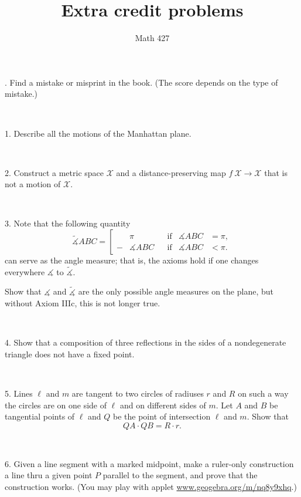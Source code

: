 \documentclass[oneside,a4paper]{article}
\def\noi{\noindent}
\begin{document}
\title{Extra credit problems}
\author{Math 427}
\date{}
\maketitle


\noi 0. Find a mistake or misprint in the book.
(The score depends on the type of mistake.)

\ 

\noi %
{1.} Describe all the motions of the Manhattan plane.

\ 

\noi %
{2.} %
Construct a metric space $\mathcal X$ and a distance-preserving map $f\:\mathcal X\to \mathcal X$ that is not a motion of $\mathcal X$.

\ 

\noi %
{3.} Note that the following quantity 
$$\tilde
\measuredangle ABC=\left[
\begin{aligned}
&\pi&&\text{if}&\measuredangle ABC&=\pi,
\\
-&\measuredangle ABC&&\text{if}&\measuredangle ABC&<\pi.
\end{aligned}
\right.$$
can serve as the angle measure; 
that is, the axioms hold if one changes everywhere $\measuredangle$ to $\tilde\measuredangle$.

Show that $\measuredangle$ and $\tilde\measuredangle$ are the only possible angle measures on the plane, but without Axiom IIIc, this is not longer true.

\ 

\noi %
{4.} %
Show that a composition of three reflections in the sides of a nondegenerate triangle does not have a fixed point.


\ 

\noi %
{5.} %
Lines $\ell$ and $m$ are tangent to two circles of radiuses $r$ and $R$ on such
a way the circles are on one side of $\ell$ and on different sides of $m$. 
Let $A$ and $B$ be
tangential points of $\ell$ and $Q$ be the point of intersection $\ell$ and $m$. 
Show that
$$QA\cdot QB = R\cdot r.$$

\ 

\noi %
{6.} %
Given a line segment with a marked midpoint, make a ruler-only construction a line thru a given point $P$ parallel to the segment, and prove that the construction works.
(You may play with applet \href{https://www.geogebra.org/m/nq8y9xhq}{www.geogebra.org/m/nq8y9xhq}.)
\end{document}
